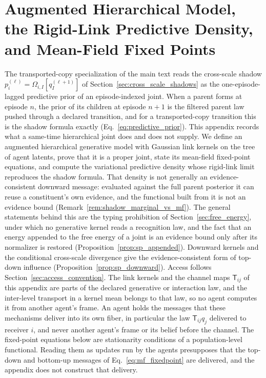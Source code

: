 \section{Augmented Hierarchical Model, the Rigid-Link Predictive Density, and Mean-Field Fixed Points}
\label{app:augmented_joint}

The transported-copy specialization of the main text reads the cross-scale shadow $p_i^{(\ell)} = \Omega_{i,I}[q_I^{(\ell+1)}]$ of Section~\ref{sec:cross_scale_shadows} as the one-episode-lagged predictive prior of an episode-indexed joint. When a parent forms at episode $n$, the prior of its children at episode $n+1$ is the filtered parent law pushed through a declared transition, and for a transported-copy transition this is the shadow formula exactly (Eq.~\eqref{eq:predictive_prior}). This appendix records what a same-time hierarchical joint does and does not supply. We define an augmented hierarchical generative model with Gaussian link kernels on the tree of agent latents, prove that it is a proper joint, state its mean-field fixed-point equations, and compute the variational predictive density whose rigid-link limit reproduces the shadow formula. That density is not generally an evidence-consistent downward message: evaluated against the full parent posterior it can reuse a constituent's own evidence, and the functional built from it is not an evidence bound (Remark~\ref{rem:shadow_marginal_vs_mf}). The general statements behind this are the typing prohibition of Section~\ref{sec:free_energy}, under which no generative kernel reads a recognition law, and the fact that an energy appended to the free energy of a joint is an evidence bound only after its normalizer is restored (Proposition~\ref{prop:sp_appended}). Downward kernels and the conditional cross-scale divergence give the evidence-consistent form of top-down influence (Proposition~\ref{prop:sp_downward}). Access follows Section~\ref{sec:access_convention}. The link kernels and the channel maps $\mathsf T_{ij}$ of this appendix are parts of the declared generative or interaction law, and the inter-level transport in a kernel mean belongs to that law, so no agent computes it from another agent's frame. An agent holds the messages that these mechanisms deliver into its own fiber, in particular the law $\mathsf T_{ij}q_j$ delivered to receiver $i$, and never another agent's frame or its belief before the channel. The fixed-point equations below are stationarity conditions of a population-level functional. Reading them as updates run by the agents presupposes that the top-down and bottom-up messages of Eq.~\eqref{eq:mf_fixedpoint} are delivered, and the appendix does not construct that delivery.

